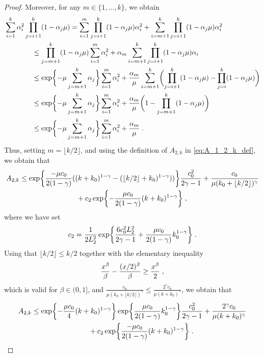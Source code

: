 \begin{proof}
Moreover, for any $m\in\{1,\ldots ,k\}$, we obtain 
\begin{align}
&\sum_{i=1}^k \alpha_i^2 \prod_{j=i+1}^k(1-\alpha_j\mu) = \sum_{i=1}^m\prod_{j=i+1}^k(1-\alpha_j\mu)\alpha_i^2 + \sum_{i=m+1}^k\prod_{j=i+1}^k(1-\alpha_j\mu)\alpha_i^2 \\
&\qquad \qquad \leq \prod_{j=m+1}^k(1-\alpha_j\mu)\sum_{i=1}^{m}\alpha_i^2 +\alpha_m\sum_{i=m+1}^k\prod_{j=i+1}^k(1-\alpha_j\mu)\alpha_i \\
&\qquad \qquad \leq \exp\biggl\{-\mu\sum_{j=m+1}^k\alpha_j\biggr\}\sum_{i=1}^{m}\alpha_i^2 + \frac{\alpha_m}{\mu}\sum_{i=m+1}^k\biggl(\prod_{j=i+1}^k(1-\alpha_j\mu)-\prod_{j=i}^k(1-\alpha_j\mu)\biggr) \\
&\qquad \qquad  \leq \exp\biggl\{-\mu\sum_{j=m+1}^k\alpha_j\biggr\}\sum_{i=1}^{m}\alpha_i^2 + \frac{\alpha_m}{\mu}\biggl(1-\prod_{j=m+1}^k(1-\alpha_j\mu)\biggr) \\
&\qquad \qquad \leq  \exp\biggl\{-\mu\sum_{j=m+1}^k\alpha_j\biggr\}\sum_{i=1}^{m}\alpha_i^2 + \frac{\alpha_m}{\mu}\;.
\end{align}
Thus, setting $m= \lfloor k/2 \rfloor $, and using the definition of $A_{2,k}$ in \eqref{eq:A_1_2_k_def}, we obtain that 
\begin{align}
A_{2,k} &\leq \exp\biggl\{\frac{-\mu c_0}{2(1-\gamma)}((k+k_0)^{1-\gamma}-(\lfloor k/2\rfloor+k_0)^{1-\gamma}))\biggr\} \frac{c_0^2}{2\gamma-1} + \frac{c_0}{\mu(k_0+\lfloor k/2 \rfloor)^{\gamma}} \\& \qquad \qquad \qquad \qquad+ c_2 \exp\biggl\{-\frac{\mu c_0}{2(1-\gamma)}(k+k_0)^{1-\gamma}\biggr\}\;,
\end{align}
where we have set
\begin{equation}
\label{eq:c_2_small}
c_2 = \frac{1}{2L_2^2} \exp\biggl\{\frac{6c_0^2 L_2^2}{2\gamma-1}+ \frac{\mu c_0}{2(1-\gamma)}k_0^{1-\gamma}\biggr\}\;.
\end{equation}
Using that $\lfloor k/2 \rfloor \leq k/2$ together with the elementary inequality 
\[
\frac{x^{\beta}}{\beta} - \frac{(x/2)^{\beta}}{\beta} \geq \frac{x^{\beta}}{2}\;,
\]
which is valid for $\beta \in (0,1]$, and $\frac{c_0}{\mu(k_0+\lfloor k/2 \rfloor)^{\gamma}} \leq \frac{2^{\gamma} c_0}{\mu (k+k_0)^{\gamma}}$, we obtain that 
\begin{align}
A_{2,k} &\leq \exp\biggl\{-\frac{\mu c_0}{4} (k+k_0)^{1-\gamma}\biggr\}\exp\biggl\{\frac{\mu c_0}{2(1-\gamma)}k_0^{1-\gamma}\biggr\}\frac{c_0^2}{2\gamma-1} + \frac{2^{\gamma} c_0}{\mu (k+k_0)^{\gamma}} \\& \qquad \qquad \qquad \qquad + c_2 \exp\biggl\{\frac{-\mu c_0}{2(1-\gamma)}(k+k_0)^{1-\gamma}\biggr\}\eqsp.

\end{align}
\end{proof}
